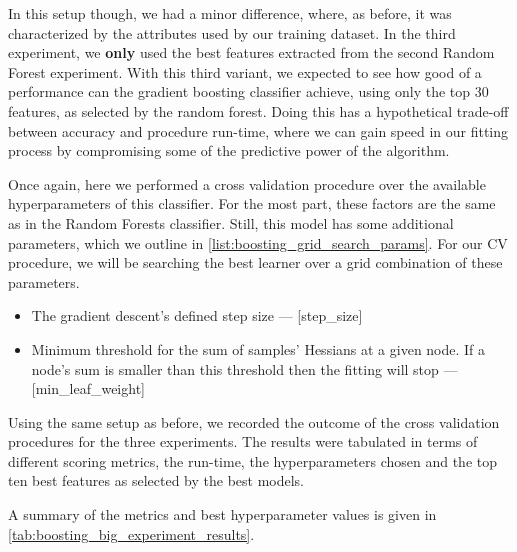 In this setup though, we had a minor difference, where, as before, it was characterized by the attributes used by our training dataset.
In the third experiment, we \textbf{only} used the best features extracted from the second Random Forest experiment.
With this third variant, we expected to see how good of a performance can the gradient boosting classifier achieve, using only the top 30 features, as selected by the random forest.
Doing this has a hypothetical trade-off between accuracy and procedure run-time, where we can gain speed in our fitting process by compromising some of the predictive power of the algorithm.

Once again, here we performed a cross validation procedure over the available hyperparameters of this classifier.
For the most part, these factors are the same as in the Random Forests classifier.
Still, this model has some additional parameters, which we outline in \cref{list:boosting_grid_search_params}.
For our CV procedure, we will be searching the best learner over a grid combination of these parameters.

\begin{itemize}

  \item The gradient descent's defined step size  --- [step\_size]
  \item Minimum threshold for the sum of samples' Hessians at a given node. If a node's sum is smaller than this threshold then the fitting will stop  --- [min\_leaf\_weight]
\label{list:boosting_grid_search_params}
\end{itemize}


Using the same setup as before, we recorded the outcome of the cross validation procedures for the three experiments.
The results were tabulated in terms of different scoring metrics, the run-time, the hyperparameters chosen and the top ten best features as selected by the best models.

A summary of the metrics and best hyperparameter values is given in \cref{tab:boosting_big_experiment_results}.

